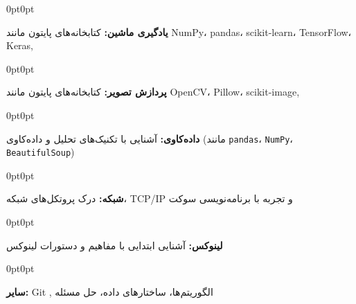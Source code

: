 \documentclass[10pt, a4paper]{article}
\newenvironment{onecolentry}{
    \begin{adjustwidth}{0pt}{0pt}
}{\end{adjustwidth}}
\begin{document}
\vspace{0.1 cm}

\begin{onecolentry}
    \textbf{یادگیری ماشین:} کتابخانه‌های پایتون مانند NumPy، pandas، scikit-learn، TensorFlow، Keras,
\end{onecolentry}

\vspace{0.1 cm}

\begin{onecolentry}
    \textbf{پردازش تصویر:} کتابخانه‌های پایتون مانند OpenCV، Pillow، scikit-image,
\end{onecolentry}

\vspace{0.1 cm}

\begin{onecolentry}
    \textbf{داده‌کاوی:} آشنایی با تکنیک‌های تحلیل و داده‌کاوی (مانند \texttt{pandas}، \texttt{NumPy}، \texttt{BeautifulSoup})
\end{onecolentry}

\vspace{0.1 cm}

\begin{onecolentry}
    \textbf{شبکه:} درک پروتکل‌های شبکه، TCP/IP و تجربه با برنامه‌نویسی سوکت
\end{onecolentry}

\vspace{0.1 cm}

\begin{onecolentry}
    \textbf{لینوکس:} آشنایی ابتدایی با مفاهیم و دستورات لینوکس
\end{onecolentry}

\vspace{0.1 cm}

\begin{onecolentry}
    \textbf{سایر:} Git , الگوریتم‌ها، ساختارهای داده، حل مسئله
\end{onecolentry}
\end{document}
